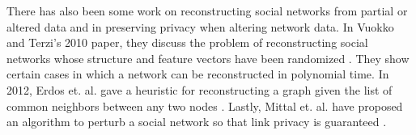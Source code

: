 \indent There has also been some work on reconstructing social networks from partial or altered data and in preserving privacy when altering network data. In Vuokko and Terzi's 2010 paper, they discuss the problem of reconstructing social networks whose structure and feature vectors have been randomized \cite{Vuokko10}. They show certain cases in which a network can be reconstructed in polynomial time. In 2012, Erdos et. al. gave a heuristic for reconstructing a graph given the list of common neighbors between any two nodes \cite{Erdos12}. Lastly, Mittal et. al. have proposed an algorithm to perturb a social network so that link privacy is guaranteed \cite{Mittal13}. \\